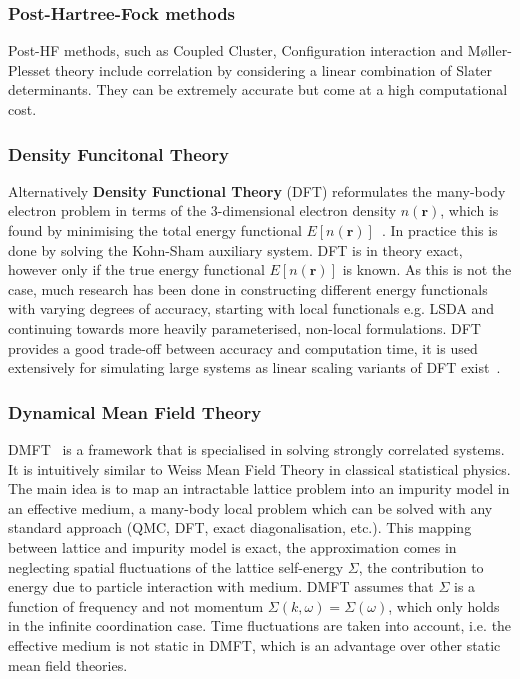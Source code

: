 \subsubsection{Post-Hartree-Fock methods}
Post-HF methods, such as Coupled Cluster, Configuration interaction and M\o ller-Plesset theory include correlation by considering a linear combination of Slater determinants. They can be extremely accurate but come at a high computational cost. 

\subsubsection{Density Funcitonal Theory}
Alternatively \textbf{Density Functional Theory} (DFT) reformulates the many-body electron problem in terms of the $3$-dimensional electron density $n(\mathbf{r})$, which is found by minimising the total energy functional $E[n(\mathbf{r})]$~\cite{hohenberg1964inhomogeneous}. In practice this is done by solving the Kohn-Sham auxiliary system. DFT is in theory exact, however only if the true energy functional $E[n(\mathbf{r})]$ is known. As this is not the case, much research has been done in constructing different energy functionals with varying degrees of accuracy, starting with local functionals e.g. LSDA and continuing towards more heavily parameterised, non-local formulations. DFT provides a good trade-off between accuracy and computation time, it is used extensively for simulating large systems as linear scaling variants of DFT exist~\cite{skylaris2005introducing}. 

\subsubsection{Dynamical Mean Field Theory}
DMFT~\cite{held2007electronic} is a framework that is specialised in solving strongly correlated systems. It is intuitively similar to Weiss Mean Field Theory in classical statistical physics. The main idea is to map an intractable lattice problem into an impurity model in an effective medium, a many-body local problem which can be solved with any standard approach (QMC, DFT, exact diagonalisation, etc.). This mapping between lattice and impurity model is exact, the approximation comes in neglecting spatial fluctuations of the lattice self-energy $\Sigma$, the contribution to energy due to particle interaction with medium. DMFT assumes that $\Sigma$ is a function of frequency and not momentum $\Sigma(k, \omega) = \Sigma(\omega)$, which only holds in the infinite coordination case. Time fluctuations are taken into account, i.e. the effective medium is not static in DMFT, which is an advantage over other static mean field theories. 

